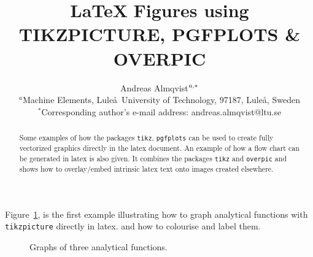 \documentclass[10pt,a4paper]{article}
\begin{document}
	\title{\LaTeX \,\,Figures using\\ TIKZPICTURE, PGFPLOTS \& OVERPIC}
	\author{
		{\small Andreas Almqvist}$^{a,\ast}\text{\small}$\\
		{$^{a}${\small Machine Elements, Lule\aa \ University of Technology, 97187, Lule\aa , Sweden}}\\
		{$^{\ast}${\small Corresponding author's e-mail address: andreas.almqvist@ltu.se}}
	}
	\date{}
	\maketitle
	\begin{abstract}
	Some examples of how the packages \texttt{tikz}, \texttt{pgfplots} can be used to create fully vectorized graphics directly in the latex document. An example of how a flow chart can be generated in latex is also given. It combines the packages \texttt{tikz} and \texttt{overpic} and shows how to overlay/embed intrinsic latex text onto images created elsewhere.
	\end{abstract}
	\vspace{0.5cm}\noindent
	Figure~\ref{fig:analytical}, is the first example illustrating how to graph analytical functions with \texttt{tikzpicture} directly in latex. and how to colourise and label them.
	\begin{figure}[!ht]
		\centering
		\caption{Graphs of three analytical functions.}
		\label{fig:analytical}
	\end{figure}
	
\end{document}
